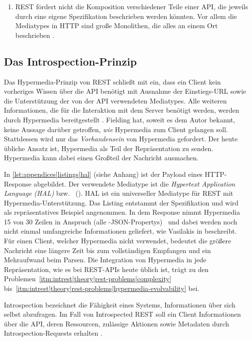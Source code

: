 \begin{enumerate}[label=\textbf{P\arabic*}]
    \item\label{itm:intrest|theory|rest-problems|no-composition} REST fördert nicht die Komposition verschiedener Teile einer API, die jeweils durch eine eigene Spezifikation beschrieben werden könnten. Vor allem die Mediatypes in HTTP sind große Monolithen, die alles an einem Ort beschrieben \autocite[Abs.~8.2.7.2]{Vasilakis2017}.
\end{enumerate}

\subsection{Das Introspection-Prinzip}\label{subsec:intrest|theory|introspection}
Das Hypermedia-Prinzip von REST schließt mit ein, dass ein Client kein vorheriges Wissen über die API benötigt mit Ausnahme der Einstiegs-URL sowie die Unterstützung der von der API verwendeten Mediatypes. Alle weiteren Informationen, die für die Interaktion mit dem Server benötigt werden, werden durch Hypermedia bereitgestellt \autocite{Fielding2008}. Fielding hat, soweit es dem Autor bekannt, keine Aussage darüber getroffen, \emph{wie} Hypermedia zum Client gelangen soll. Stattdessen wird nur das \emph{Vorhandensein} von Hypermedia gefordert. Der heute übliche Ansatz ist, Hypermedia als Teil der Repräsentation zu senden. Hypermedia kann dabei einen Großteil der Nachricht ausmachen.

In \cref{lst:appendices|listings|hal} (siehe Anhang) ist der Payload eines HTTP-Response abgebildet. Der verwendete Mediatype ist die \emph{Hypertext Application Language (HAL)} bzw.\  (\autocite{Kelly2016}). HAL ist ein universeller Mediatype für REST mit Hypermedia-Unterstützung. Das Listing entstammt der Spezifikation und wird als repräsentatives Beispiel angenommen. In dem Response nimmt Hypermedia 15 von 30 Zeilen in Anspruch (alle -JSON-Propertys)~\textendash{} und dabei werden noch nicht einmal umfangreiche Informationen geliefert, wie Vasilakis in \autocite[Abs.~7.3]{Vasilakis2017} beschreibt. Für einen Client, welcher Hypermedia nicht verwendet, bedeutet die größere Nachricht eine längere Zeit bis zum vollständigen Empfangen und ein Mehraufwand beim Parsen. Die Integration von Hypermedia in jede Repräsentation, wie es bei REST-APIs heute üblich ist, trägt zu den Problemen~\ref{itm:intrest|theory|rest-problems|complexity} bis~\ref{itm:intrest|theory|rest-problems|hypermedia-evolvability} bei.

\para{}Introspection bezeichnet die Fähigkeit eines Systems, Informationen über sich selbst abzufragen. Im Fall von Introspected REST soll ein Client Informationen über die API, deren Ressourcen, zulässige Aktionen sowie Metadaten durch Introspection-Requests erhalten \autocite[Abs.~9.3]{Vasilakis2017}.

